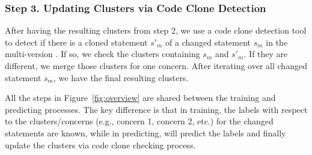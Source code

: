 
\subsubsection{{\bf Step 3. Updating Clusters via Code Clone Detection}}

After having the resulting clusters from step 2, we use a code clone
detection tool to detect if there is a cloned statement $s'_m$ of a
changed statement $s_m$ in the multi-version {\mvpdg}. If so, we check
the clusters containing $s_m$ and $s'_m$. If they are different,
we merge those clusters for one concern. After iterating over
all changed statement $s_m$, we have the final resulting clusters.


All the steps in Figure~\ref{fig:overview} are shared between the
training and predicting processes. The key difference is that in
training, the labels with respect to the clusters/concerns (e.g.,
concern 1, concern 2, etc.) for the changed statements are known,
while in predicting, {\tool} will predict the labels and finally
update the clusters via code clone checking process.

